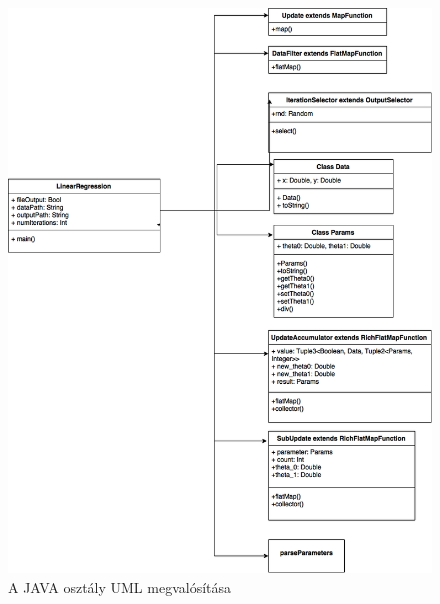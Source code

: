 \documentclass[a4paper,12pt]{article}
\begin{document}
\begin{figure}[H]
\centering
\includegraphics[width=130mm]{img/java.png}
\caption{A JAVA osztály UML megvalósítása} \label{}
\end{figure}


\newpage

\printbibliography
\end{document}
